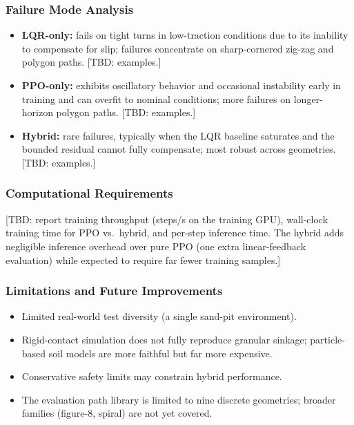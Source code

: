 \documentclass[conference]{IEEEtran}
\begin{document}
\subsubsection{Failure Mode Analysis}
\begin{itemize}
\item \textbf{LQR-only:} fails on tight turns in low-traction conditions due to its inability to compensate for slip; failures concentrate on sharp-cornered zig-zag and polygon paths. [TBD: examples.]
\item \textbf{PPO-only:} exhibits oscillatory behavior and occasional instability early in training and can overfit to nominal conditions; more failures on longer-horizon polygon paths. [TBD: examples.]
\item \textbf{Hybrid:} rare failures, typically when the LQR baseline saturates and the bounded residual cannot fully compensate; most robust across geometries. [TBD: examples.]
\end{itemize}

\subsubsection{Computational Requirements}
[TBD: report training throughput (steps/s on the training GPU), wall-clock training time for PPO vs.\ hybrid, and per-step inference time. The hybrid adds negligible inference overhead over pure PPO (one extra linear-feedback evaluation) while expected to require far fewer training samples.]

\subsubsection{Limitations and Future Improvements}
\begin{itemize}
\item Limited real-world test diversity (a single sand-pit environment).
\item Rigid-contact simulation does not fully reproduce granular sinkage; particle-based soil models \cite{orsula2025sim2dust} are more faithful but far more expensive.
\item Conservative safety limits may constrain hybrid performance.
\item The evaluation path library is limited to nine discrete geometries; broader families (figure-8, spiral) are not yet covered.
\end{itemize}
\end{document}
